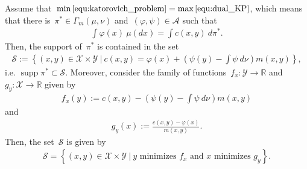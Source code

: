 \documentclass[10pt,a4paper]{amsart}
\DeclareMathOperator{\supp}{supp}
\def\cS{\mathcal{S}}
\begin{document}
 \begin{proposition}\label{the:characterization_support_optimal_transport_plan}
          Assume that~$\min \eqref{equ:katorovich_problem} = \max \eqref{equ:dual_KP}$, which means that there is~$\pi^* \in \Gamma_{m} (\mu, \nu)$ and~$(\varphi, \psi) \in \mathcal{A}$ such that
    \begin{align}\label{equ:strong_duality_specific}
       \int \varphi(x) \  \mu(dx) = \int c(x,y)  \ d  \pi^*.
    \end{align}
        Then, the support of~$\pi^*$  is contained in the set
        \begin{align}\label{equ:support_pi_contained_in_c_convex_set}
            \cS :=  \left\{ (x,y) \in \mathcal{X} \times \mathcal{Y} \ | \ c(x,y) = \varphi(x) + \left( \psi(y) - \int \psi \ d \nu \right) m(x,y) \right\},
        \end{align} 
        i.e. $\supp \pi^* \subset \cS$. 
        Moreover, consider the family of functions~$f_x: \mathcal{Y} \to \mathbb{R}$ and~$g_y: \mathcal{X} \to \mathbb{R}$ given by 
        \begin{align}\label{equ:criterion_optimal_transport_map}
            f_x(y):= c(x,y) - \left(\psi(y)- \int \psi \ d \nu \right) m(x,y)
        \end{align}
        and
        \begin{align}\label{equ:criterion_dual_optimal_transport_map}
            g_y(x):= \frac{ c(x,y) - \varphi(x)}{m(x,y)}.
        \end{align}
        Then, the set~$\cS$ is given by
        \begin{align}\label{equ:support_pi_characterized via minima}
            \cS = \left\lbrace (x,y) \in \mathcal{X} \times \mathcal{Y} \ | \ y \mbox{ minimizes } f_x \mbox{ and } x \mbox{ minimizes } g_y \right\rbrace.
        \end{align}
        
    \end{proposition}
\end{document}
